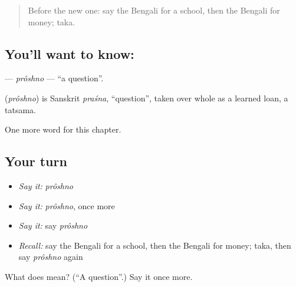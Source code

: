 \label{lesson:BN-C64-proshno}



\begin{quote}
Before the new one: say the Bengali for a school, then the Bengali for money; taka.
\end{quote}

\subsection*{You'll want to know: }
\textbf{} — \emph{prôshno} — \textquotedblleft{}a question\textquotedblright{}.

\begin{cousinweb}
\textbf{} (\emph{prôshno}) is Sanskrit \emph{praśna}, \textquotedblleft{}question\textquotedblright{}, taken over whole as a learned loan, a tatsama.
\end{cousinweb}

\begin{grammarlens}[title={What you've built}]
One more word for this chapter.
\end{grammarlens}

\subsection*{Your turn}
\begin{itemize}
\raggedright
  \item \emph{Say it:} \emph{prôshno}
  \item \emph{Say it:} \emph{prôshno}, once more
  \item \emph{Say it:} say \emph{prôshno}
  \item \emph{Recall:} say the Bengali for a school, then the Bengali for money; taka, then say \emph{prôshno} again
\end{itemize}

\begin{tcolorbox}[breakable,colback=teal!4,colframe=teal!35!black,title={Before you move on}]
What does  mean? (\textquotedblleft{}A question\textquotedblright{}.) Say it once more.
\end{tcolorbox}
